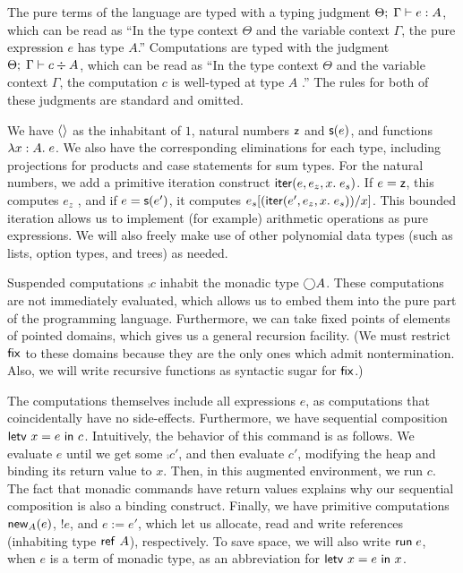 \documentclass[preprint,natbib]{sigplanconf}
\begin{document}
The pure terms of the language are typed with a typing judgment
${\Theta};\;{\Gamma} \vdash {e} : {A}$, which can be read as ``In the type context
$\Theta$ and the variable context $\Gamma$, the pure expression $e$
has type $A$.'' Computations are typed with the judgment
${\Theta};\;{\Gamma} \vdash {c} \div {A}$, which can be read as ``In the type context
$\Theta$ and the variable context $\Gamma$, the computation $c$ is
well-typed at type $A$ .'' The rules for both of these judgments are
standard and omitted.

We have $\left<\right>$ as the inhabitant of $1$, natural numbers $\mbox{\textsf{{z}}}$ and
$\mbox{\textsf{{s}}}(e)$, and functions $\lambda x:A.\;e$. We also have the corresponding
eliminations for each type, including projections for products and
case statements for sum types. For the natural numbers, we add a
primitive iteration construct $\mbox{\textsf{{iter}}}(e, {e_z}, {x}.\; {e_s})$. If $e = \mbox{\textsf{{z}}}$,
this computes $e_z$ , and if $e = \mbox{\textsf{{s}}}(e')$, it computes
$e_s[(\mbox{\textsf{{iter}}}(e', {e_z}, {x}.\; {e_s}))/x]$. This bounded iteration allows us
to implement (for example) arithmetic operations as pure expressions.
We will also freely make use of other polynomial data types (such as
lists, option types, and trees) as needed. 

Suspended computations $\comp{c}$ inhabit the monadic type
$\bigcirc{A}$.  These computations are not immediately evaluated, which
allows us to embed them into the pure part of the programming
language. Furthermore, we can take fixed points of elements of pointed
domains, which gives us a general recursion facility. (We must
restrict $\mbox{\textsf{{fix}}}$ to these domains because they are the only ones
which admit nontermination. Also, we will write recursive functions as
syntactic sugar for $\mbox{\textsf{{fix}}}$.)  

The computations themselves include all expressions $e$, as
computations that coincidentally have no side-effects. Furthermore, we
have sequential composition $\mbox{\textsf{{letv }}}x = e\mbox{\textsf{{ in }}}c$. Intuitively, the
behavior of this command is as follows. We evaluate $e$ until we get
some $\comp{c'}$, and then evaluate $c'$, modifying the heap and
binding its return value to $x$. Then, in this augmented environment,
we run $c$. The fact that monadic commands have return values explains
why our sequential composition is also a binding construct. Finally,
we have primitive computations $\mbox{\textsf{{new}}}_{A}(e)$, $!e$, and $e := e'$,
which let us allocate, read and write references (inhabiting type
$\mbox{\textsf{{ref }}}A$), respectively. To save space, we will also write
$\mbox{\textsf{{run}}}\;e$, when $e$ is a term of monadic type, as an
abbreviation for $\mbox{\textsf{{letv }}}x = e\mbox{\textsf{{ in }}}x$.
\end{document}
